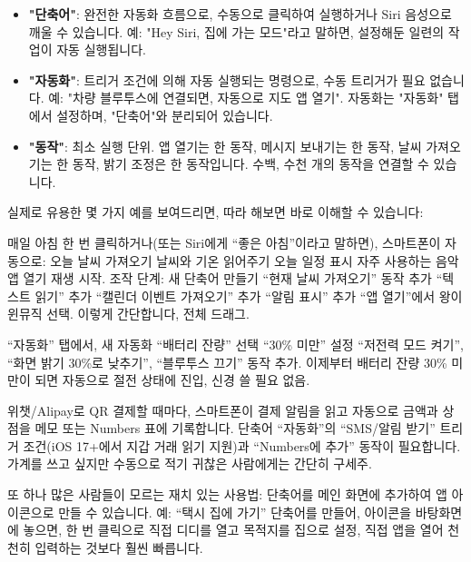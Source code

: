\begin{itemize}
  \item \textbf{"단축어"}: 완전한 자동화 흐름으로, 수동으로 클릭하여 실행하거나 Siri 음성으로 깨울 수 있습니다. 예: "Hey Siri, 집에 가는 모드"라고 말하면, 설정해둔 일련의 작업이 자동 실행됩니다.
  \item \textbf{"자동화"}: 트리거 조건에 의해 자동 실행되는 명령으로, 수동 트리거가 필요 없습니다. 예: "차량 블루투스에 연결되면, 자동으로 지도 앱 열기". 자동화는 "자동화" 탭에서 설정하며, "단축어"와 분리되어 있습니다.
  \item \textbf{"동작"}: 최소 실행 단위. 앱 열기는 한 동작, 메시지 보내기는 한 동작, 날씨 가져오기는 한 동작, 밝기 조정은 한 동작입니다. 수백, 수천 개의 동작을 연결할 수 있습니다.
\end{itemize}

실제로 유용한 몇 가지 예를 보여드리면, 따라 해보면 바로 이해할 수 있습니다:


매일 아침 한 번 클릭하거나(또는 Siri에게 “좋은 아침”이라고 말하면), 스마트폰이 자동으로: 오늘 날씨 가져오기 날씨와 기온 읽어주기 오늘 일정 표시 자주 사용하는 음악 앱 열기 재생 시작. 조작 단계: 새 단축어 만들기 “현재 날씨 가져오기” 동작 추가 “텍스트 읽기” 추가 “캘린더 이벤트 가져오기” 추가 “알림 표시” 추가 “앱 열기”에서 왕이윈뮤직 선택. 이렇게 간단합니다, 전체 드래그.


“자동화” 탭에서, 새 자동화 “배터리 잔량” 선택 “30\% 미만” 설정 “저전력 모드 켜기”, “화면 밝기 30\%로 낮추기”, “블루투스 끄기” 동작 추가. 이제부터 배터리 잔량 30\% 미만이 되면 자동으로 절전 상태에 진입, 신경 쓸 필요 없음.


위챗/Alipay로 QR 결제할 때마다, 스마트폰이 결제 알림을 읽고 자동으로 금액과 상점을 메모 또는 Numbers 표에 기록합니다. 단축어 “자동화”의 “SMS/알림 받기” 트리거 조건(iOS 17+에서 지갑 거래 읽기 지원)과 “Numbers에 추가” 동작이 필요합니다. 가계를 쓰고 싶지만 수동으로 적기 귀찮은 사람에게는 간단히 구세주.

또 하나 많은 사람들이 모르는 재치 있는 사용법: 단축어를 메인 화면에 추가하여 앱 아이콘으로 만들 수 있습니다. 예: “택시 집에 가기” 단축어를 만들어, 아이콘을 바탕화면에 놓으면, 한 번 클릭으로 직접 디디를 열고 목적지를 집으로 설정, 직접 앱을 열어 천천히 입력하는 것보다 훨씬 빠릅니다.



